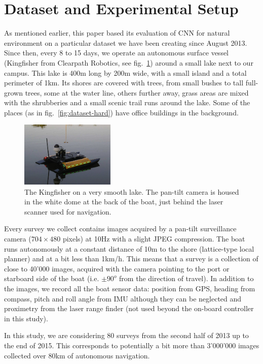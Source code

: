 \section{Dataset and Experimental Setup}
As mentioned earlier, this paper based its evaluation of CNN for natural
environment on a particular dataset we have been creating since August 2013.
Since then, every 8 to 15 days, we operate an autonomous surface vessel
(Kingfisher from Clearpath Robotics, see fig.~\ref{fig:kingfisher}) around a small lake next to our campus.
This lake is 400m long by 200m wide, with a small island and a total perimeter
of 1km. Its shores are covered with trees, from small bushes to tall full-grown
trees, some at the water line, others further away, grass areas are mixed
with the shrubberies and a small scenic trail runs around the lake. Some of the
places (as in fig.~\ref{fig:dataset-hard}) have office buildings in the
background. 
\begin{figure}[htb]
    \centering
    \includegraphics[width=0.4\textwidth]{images/kingfisher}
    \caption{The Kingfisher on a very smooth lake. The pan-tilt camera is
        housed in the white dome at the back of the boat, just behind the laser
    scanner used for navigation.}
    \label{fig:kingfisher}
\end{figure}

Every survey we collect contains images acquired by a pan-tilt surveillance
camera ($704\times480$ pixels) at 10Hz with a slight JPEG compression. The boat
runs autonomously at a constant distance of 10m to the shore (lattice-type
local planner) and at a bit less than 1km/h. This means that a survey is a
collection of close to 40'000 images, acquired with the camera pointing to the
port or starboard side of the boat (i.e. $\pm90^o$ from the direction of
travel). In addition to the images, we record all the boat sensor data:
position from GPS, heading from compass, pitch and roll angle from IMU although
they can be neglected and proximetry from the laser range finder (not used
beyond the on-board controller in this study). 

In this study, we are considering 80 surveys from the second half of 2013 up to
the end of 2015. This corresponds to potentially a bit more than 3'000'000
images collected over 80km of autonomous navigation. 

